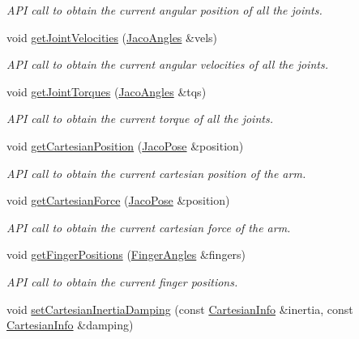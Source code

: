 \begin{DoxyCompactItemize}
\begin{DoxyCompactList}\small\item\em A\+PI call to obtain the current angular position of all the joints. \end{DoxyCompactList}\item 
void \hyperlink{classjaco_1_1_jaco_comm_aa81b5cdf89bd2c7259be3638fdb4f75a}{get\+Joint\+Velocities} (\hyperlink{classjaco_1_1_jaco_angles}{Jaco\+Angles} \&vels)
\begin{DoxyCompactList}\small\item\em A\+PI call to obtain the current angular velocities of all the joints. \end{DoxyCompactList}\item 
void \hyperlink{classjaco_1_1_jaco_comm_af2ba4b35149e292fa5279768d47216cb}{get\+Joint\+Torques} (\hyperlink{classjaco_1_1_jaco_angles}{Jaco\+Angles} \&tqs)
\begin{DoxyCompactList}\small\item\em A\+PI call to obtain the current torque of all the joints. \end{DoxyCompactList}\item 
void \hyperlink{classjaco_1_1_jaco_comm_a855bbefed2093d0d0cc7763eb7306a0b}{get\+Cartesian\+Position} (\hyperlink{classjaco_1_1_jaco_pose}{Jaco\+Pose} \&position)
\begin{DoxyCompactList}\small\item\em A\+PI call to obtain the current cartesian position of the arm. \end{DoxyCompactList}\item 
void \hyperlink{classjaco_1_1_jaco_comm_af181d7ddd7baeff6e46720648e7e1f31}{get\+Cartesian\+Force} (\hyperlink{classjaco_1_1_jaco_pose}{Jaco\+Pose} \&position)
\begin{DoxyCompactList}\small\item\em A\+PI call to obtain the current cartesian force of the arm. \end{DoxyCompactList}\item 
void \hyperlink{classjaco_1_1_jaco_comm_a7644bf1154b59bf4d8b97c200284e3fb}{get\+Finger\+Positions} (\hyperlink{classjaco_1_1_finger_angles}{Finger\+Angles} \&fingers)
\begin{DoxyCompactList}\small\item\em A\+PI call to obtain the current finger positions. \end{DoxyCompactList}\item 
void \hyperlink{classjaco_1_1_jaco_comm_afbb443b8e3fe71ef58b0013fdb3d5674}{set\+Cartesian\+Inertia\+Damping} (const \hyperlink{struct_cartesian_info}{Cartesian\+Info} \&inertia, const \hyperlink{struct_cartesian_info}{Cartesian\+Info} \&damping)

\end{DoxyCompactItemize}
